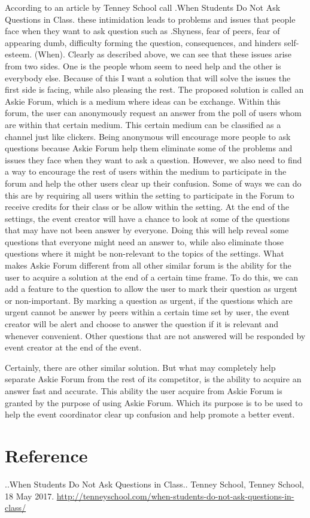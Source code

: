 \documentclass[12pt]{article}
\begin{document}
According to an article by Tenney School call .When Students Do Not Ask Questions in Class. these intimidation leads to problems and issues that people face when they want to ask question such as .Shyness, fear of peers, fear of appearing dumb, difficulty forming the question, consequences, and hinders self-esteem. (When). Clearly as described above, we can see that these issues arise from two sides. One is the people whom seem to need help and the other is everybody else. Because of this I want a solution that will solve the issues the first side is facing, while also pleasing the rest. The proposed solution is called an Askie Forum, which is a medium where ideas can be exchange. Within this forum, the user can anonymously request an answer from the poll of users whom are within that certain medium. This certain medium can be classified as a channel just like clickers. Being anonymous will encourage more people to ask questions because Askie Forum help them eliminate some of the problems and issues they face when they want to ask a question. However, we also need to find a way to encourage the rest of users within the medium to participate in the forum and help the other users clear up their confusion. Some of ways we can do this are by requiring all users within the setting to participate in the Forum to receive credits for their class or be allow within the setting. At the end of the settings, the event creator will have a chance to look at some of the questions that may have not been answer by everyone.  Doing this will help reveal some questions that everyone might need an answer to, while also eliminate those questions where it might be non-relevant to the topics of the settings. What makes Askie Forum different from all other similar forum is the ability for the user to acquire a solution at the end of a certain time frame. To do this, we can add a feature to the question to allow the user to mark their question as urgent or non-important. By marking a question as urgent, if the questions which are urgent cannot be answer by peers within a certain time set by user, the event creator will be alert and choose to answer the question if it is relevant and whenever convenient. Other questions that are not answered will be responded by event creator at the end of the event.

Certainly, there are other similar solution. But what may completely help separate Askie Forum from the rest of its competitor, is the ability to acquire an answer fast and accurate. This ability the user acquire from Askie Forum is granted by the purpose of using Askie Forum. Which its purpose is to be used to help the event coordinator clear up confusion and help promote a better event. 

\section{Reference}
\begin{flushleft}
[1] ..When Students Do Not Ask Questions in Class.. Tenney School, Tenney School, 18 May 2017.
\url{http://tenneyschool.com/when-students-do-not-ask-questions-in-class/}
\newline
\end{flushleft}
\end{document}
